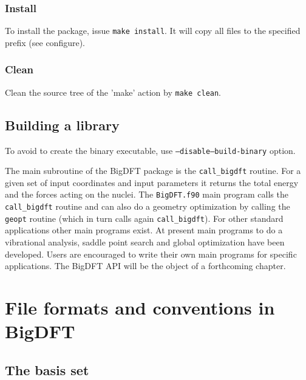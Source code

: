 \documentclass[a4paper,11pt]{report}
\begin{document}
\subsection{Install}
To install the package, issue \texttt{make install}. It will copy all files to the specified prefix (see configure).

\subsection{Clean}
Clean the source tree of the 'make' action by \texttt{make clean}.

\section{Building a library}
To avoid to create the binary executable,
use \texttt{--disable--build-binary} option.

The main subroutine of the BigDFT package is the \texttt{call\_bigdft} routine. For a given set of input coordinates 
and input parameters it returns the total energy and the forces acting on the nuclei. The \texttt{BigDFT.f90} main program 
calls the \texttt{call\_bigdft} routine and can also do a geometry optimization by calling the \texttt{geopt} routine (which in turn calls 
again \texttt{call\_bigdft}). For other standard applications other main programs exist.
At present main programs to do a vibrational analysis, saddle point search and global optimization have been developed.
Users are encouraged to write their own main programs for specific applications. 
The BigDFT API will be the object of a forthcoming chapter.

\chapter{File formats and conventions in BigDFT}
\section{The basis set}
\end{document}
